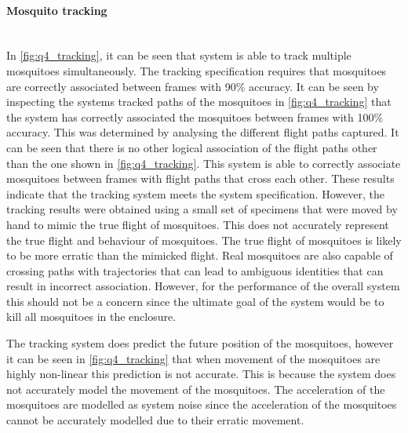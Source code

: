 \paragraph{Mosquito tracking}\hfill\\
In \autoref{fig:q4_tracking}, it can be seen that system is able to track multiple mosquitoes simultaneously. The tracking specification requires that mosquitoes are correctly associated between frames with 90\% accuracy. It can be seen by inspecting the systems tracked paths of the mosquitoes in \autoref{fig:q4_tracking} that the system has correctly associated the mosquitoes between frames with 100\% accuracy. This was determined by analysing the different flight paths captured. It can be seen that there is no other logical association of the flight paths other than the one shown in \autoref{fig:q4_tracking}. This system is able to correctly associate mosquitoes between frames with flight paths that cross each other. These results indicate that the tracking system meets the system specification. However, the tracking results were obtained using a small set of specimens that were moved by hand to mimic the true flight of mosquitoes. This does not accurately represent the true flight and behaviour of mosquitoes. The true flight of mosquitoes is likely to be more erratic than the mimicked flight. Real mosquitoes are also capable of crossing paths with trajectories that can lead to ambiguous identities that can result in incorrect association. However, for the performance of the overall system this should not be a concern since the ultimate goal of the system would be to kill all mosquitoes in the enclosure.

The tracking system does predict the future position of the mosquitoes, however it can be seen in \autoref{fig:q4_tracking} that when movement of the mosquitoes are highly non-linear this prediction is not accurate. This is because the system does not accurately model the movement of the mosquitoes. The acceleration of the mosquitoes are modelled as system noise since the acceleration of the mosquitoes cannot be accurately modelled due to their erratic movement.

